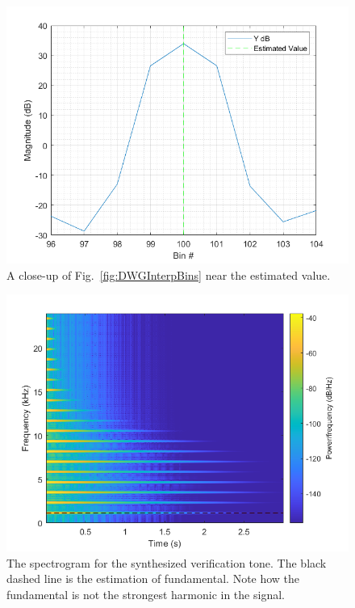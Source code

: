 \documentclass[../main.tex]{subfiles}
\begin{document}
\begin{figure}[h!]
    \centering
    \includegraphics[scale=.58]{./images/plots/StringDWGInterpBinsZoom.png}
    \caption{A close-up of Fig.~\ref{fig:DWGInterpBins} near the estimated value.}
    \label{fig:DWGInterpBinsZoom}
\end{figure}

\begin{figure}[h!]
    \centering
    \includegraphics[scale=.58]{./images/plots/StringDWGInterpSpec.png}
    \caption{The spectrogram for the synthesized verification tone. The black dashed line is the estimation of fundamental. Note how the fundamental is not the strongest harmonic in the signal.}
    \label{fig:DWGInterpSpec}
\end{figure}
\end{document}
